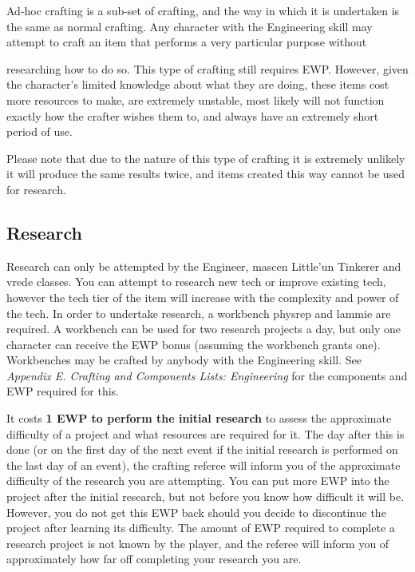 Ad-hoc crafting is a sub-set of crafting, and the way in which it is undertaken is the same as normal crafting. Any character with the Engineering skill may attempt to craft an item that performs a very particular purpose without

researching how to do so. This type of crafting still requires EWP. However, given the character's limited knowledge about what they are doing, these items cost more resources to make, are extremely unstable, most likely will not function exactly how the crafter wishes them to, and always have an extremely short period of use.

Please note that due to the nature of this type of crafting it is extremely unlikely it will produce the same results twice, and items created this way cannot be used for research.

\subsection{Research}

Research can only be attempted by the Engineer, mascen Little'un Tinkerer and vrede classes. You can attempt to research new tech or improve existing tech, however the tech tier of the item will increase with the complexity and power of the tech. In order to undertake research, a workbench physrep and lammie are required. A workbench can be used for two research projects a day, but only one character can receive the EWP bonus (assuming the workbench grants one). Workbenches may be crafted by anybody with the Engineering skill. See \textit{Appendix E. Crafting and Components Lists: Engineering} for the components and EWP required for this.

It costs \textbf{1 EWP to perform the initial research} to assess the approximate difficulty of a project and what resources are required for it. The day after this is done (or on the first day of the next event if the initial research is performed on the last day of an event), the crafting referee will inform you of the approximate difficulty of the research you are attempting. You can put more EWP into the project after the initial research, but not before you know how difficult it will be. However, you do not get this EWP back should you decide to discontinue the project after learning its difficulty. The amount of EWP required to complete a research project is not known by the player, and the referee will inform you of approximately how far off completing your research you are.

